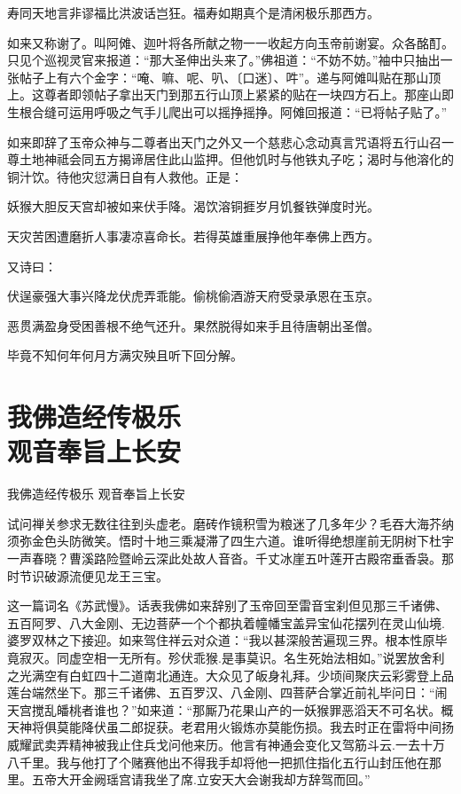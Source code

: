 \documentclass[12pt,UTF8]{ctexbook}
\begin{document}
{寿同天地言非谬福比洪波话岂狂。福寿如期真个是清闲极乐那西方。

如来又称谢了。叫阿傩、迦叶将各所献之物一一收起方向玉帝前谢宴。众各酩酊。只见个巡视灵官来报道：“那大圣伸出头来了。”佛祖道：“不妨不妨。”袖中只抽出一张帖子上有六个金字：“唵、嘛、呢、叭、〔口迷〕、吽”。递与阿傩叫贴在那山顶上。这尊者即领帖子拿出天门到那五行山顶上紧紧的贴在一块四方石上。那座山即生根合缝可运用呼吸之气手儿爬出可以摇挣摇挣。阿傩回报道：“已将帖子贴了。”

如来即辞了玉帝众神与二尊者出天门之外又一个慈悲心念动真言咒语将五行山召一尊土地神祗会同五方揭谛居住此山监押。但他饥时与他铁丸子吃；渴时与他溶化的铜汁饮。待他灾愆满日自有人救他。正是：

妖猴大胆反天宫却被如来伏手降。渴饮溶铜捱岁月饥餐铁弹度时光。

天灾苦困遭磨折人事凄凉喜命长。若得英雄重展挣他年奉佛上西方。

又诗曰：

伏逞豪强大事兴降龙伏虎弄乖能。偷桃偷酒游天府受录承恩在玉京。

恶贯满盈身受困善根不绝气还升。果然脱得如来手且待唐朝出圣僧。

毕竟不知何年何月方满灾殃且听下回分解。

\chapter[我佛造经传极乐\ 观音奉旨上长安]{我佛造经传极乐\\观音奉旨上长安}

我佛造经传极乐 观音奉旨上长安

试问禅关参求无数往往到头虚老。磨砖作镜积雪为粮迷了几多年少？毛吞大海芥纳须弥金色头防微笑。悟时十地三乘凝滞了四生六道。谁听得绝想崖前无阴树下杜宇一声春晓？曹溪路险暨岭云深此处故人音沓。千丈冰崖五叶莲开古殿帘垂香袅。那时节识破源流便见龙王三宝。

这一篇词名《苏武慢》。话表我佛如来辞别了玉帝回至雷音宝刹但见那三千诸佛、五百阿罗、八大金刚、无边菩萨一个个都执着幢幡宝盖异宝仙花摆列在灵山仙境.婆罗双林之下接迎。如来驾住祥云对众道：“我以甚深般苦遍现三界。根本性原毕竟寂灭。同虚空相一无所有。殄伏乖猴.是事莫识。名生死始法相如。”说罢放舍利之光满空有白虹四十二道南北通连。大众见了皈身礼拜。少顷间聚庆云彩雾登上品莲台端然坐下。那三千诸佛、五百罗汉、八金刚、四菩萨合掌近前礼毕问日：“闹天宫搅乱皤桃者谁也？”如来道：“那厮乃花果山产的一妖猴罪恶滔天不可名状。概天神将俱莫能降伏虽二郎捉获。老君用火锻炼亦莫能伤损。我去时正在雷将中间扬威耀武卖弄精神被我止住兵戈问他来历。他言有神通会变化又驾筋斗云.一去十万八千里。我与他打了个赌赛他出不得我手却将他一把抓住指化五行山封压他在那里。五帝大开金阙瑶宫请我坐了席.立安天大会谢我却方辞驾而回。”

}
\end{document}
